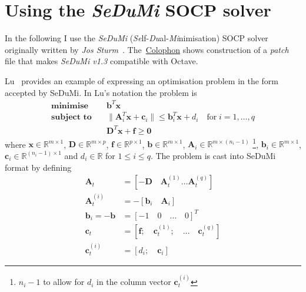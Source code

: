 \documentclass[a4paper,twoside,10pt,english]{report}
\begin{document}
\section{Using the \emph{SeDuMi} SOCP solver}
In the following I use the \emph{SeDuMi}
(\emph{Se}lf-\emph{Du}al-\emph{Mi}nimisation) SOCP solver originally written
by \emph{Jos Sturm}~\cite{Sturm_SeDuMi_1_3}. 
The~\hyperlink{sec:Colophon}{Colophon} shows construction of a \emph{patch}
file that makes \emph{SeDuMi v1.3} compatible with Octave.

Lu~\cite[Section III]{Lu_SedumiRemarks} provides an example of expressing an
optimisation problem in the form accepted by SeDuMi. In Lu's notation the 
problem is
\begin{subequations}
\begin{align}
\textbf{minimise}  \quad&\boldsymbol{b}^{T}\boldsymbol{x}
\label{eqn:Lu-SeDuMi-Remarks-problem-format}\\
\textbf{subject to}\quad&\|\boldsymbol{A}_{i}^{T}\boldsymbol{x}+
\boldsymbol{c}_{i}\| \le \boldsymbol{b}_{i}^{T}\boldsymbol{x}+d_{i}
\quad \text{for}\;i=1,\hdots,q
\label{eqn:Lu-SeDuMi-Remarks-problem-format-conic-constraints}\\
&\boldsymbol{D}^{T}\boldsymbol{x}+\boldsymbol{f}\ge\boldsymbol{0}
\label{eqn:Lu-SeDuMi-Remarks-problem-format-linear-constraints}
\end{align}
\end{subequations}
where $\boldsymbol{x}\in\mathfrak{\mathbb{R}}^{m\times 1}$, 
$\boldsymbol{D}\in\mathfrak{\mathbb{R}}^{m\times p}$, 
$\boldsymbol{f}\in\mathfrak{\mathbb{R}}^{p\times 1}$, 
$\boldsymbol{b}\in\mathfrak{\mathbb{R}}^{m\times 1}$, 
$\boldsymbol{A}_{i}\in\mathfrak{\mathbb{R}}^{m\times\left(n_{i}-1\right)}$
\footnote{$n_{i}-1$ to allow for $d_{i}$ in the column vector 
$\boldsymbol{c}_{t}^{\left(i\right)}$}, 
$\boldsymbol{b}_{i}\in\mathfrak{\mathbb{R}}^{m\times 1}$, 
$\boldsymbol{c}_{i}\in\mathfrak{\mathbb{R}}^{\left(n_{i}-1\right)\times 1}$ and
$d_{i}\in\mathfrak{\mathbb{R}}$ for $1 \le i \le q$. The problem is cast into
SeDuMi format by defining
\begin{align}
\label{eqn:Lu-SeDuMi-Remarks-problem-matrixes}
\boldsymbol{A}_{t}&=\left[-\boldsymbol{D} \quad \boldsymbol{A}_{t}^{\left(1\right)}
\hdots \boldsymbol{A}_{t}^{\left(q\right)}\right]\\
\boldsymbol{A}_{t}^{\left(i\right)} &= -\left[\boldsymbol{b}_{i} \quad
\boldsymbol{A}_{i}\right]\nonumber\\
\boldsymbol{b}_{i}=-\boldsymbol{b}&=\left[-1\quad 0\quad\hdots\quad 0\right]^{T}
\nonumber\\
\boldsymbol{c}_{t}&=\left[\boldsymbol{f};\quad \boldsymbol{c}_{t}^{\left(1\right)}
;\quad \hdots\quad \boldsymbol{c}_{t}^{\left(q\right)}\right]\nonumber\\
\boldsymbol{c}_{t}^{\left(i\right)}&=\left[d_{i} ;\quad \boldsymbol{c}_{i}\right]
\nonumber
\end{align}
\end{document}
